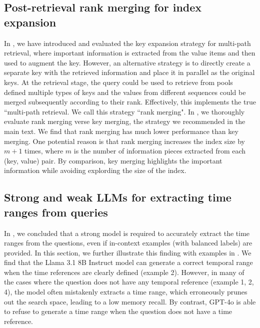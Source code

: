 \subsection{Post-retrieval rank merging for index expansion}
\label{appendix-rank-merging}

In , we have introduced and evaluated the key expansion strategy for multi-path retrieval, where important information is extracted from the value items and then used to augment the key. However, an alternative strategy is to directly create a separate key with the retrieved information and place it in parallel as the original keys. At the retrieval stage, the query could be used to retrieve from pools defined multiple types of keys and the values from different sequences could be merged subsequently according to their rank. Effectively, this implements the true ``multi-path retrieval. We call this strategy ``rank merging". In , we thoroughly evaluate rank merging verse key merging, the strategy we recommended in the main text. We find that rank merging has much lower performance than key merging. One potential reason is that rank merging increases the index size by $m+1$ times, where $m$ is the number of information pieces extracted from each (key, value) pair. By comparison, key merging highlights the important information while avoiding explording the size of the index.






\subsection{Strong and weak LLMs for extracting time ranges from queries}
\label{appendix-temp-expansion-analysis}

In , we concluded that a strong model is required to accurately extract the time ranges from the questions, even if in-context examples (with balanced labels) are provided. In this section, we further illustrate this finding with examples in . We find that the Llama 3.1 8B Instruct model can generate a correct temporal range when the time references are clearly defined (example 2). However, in many of the cases where the question does not have any temporal reference (example 1, 2, 4), the model often mistakenly extracts a time range, which erroneously prunes out the search space, leading to a low memory recall. By contrast, GPT-4o is able to refuse to generate a time range when the question does not have a time reference.

